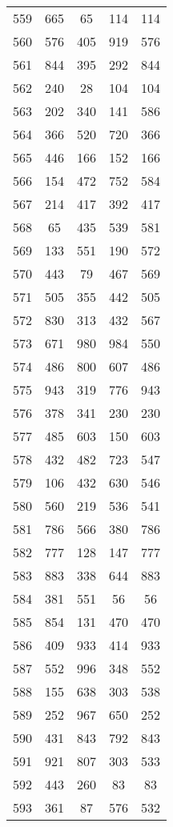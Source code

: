 \documentclass[a4paper,10pt,ngerman]{scrartcl}
\begin{document}
\begin{longtable}[c]{c|c|c|c|c}
    559 & 665 & 65 & 114 & 114 \\
    560 & 576 & 405 & 919 & 576 \\
    561 & 844 & 395 & 292 & 844 \\
    562 & 240 & 28 & 104 & 104 \\
    563 & 202 & 340 & 141 & 586 \\
    564 & 366 & 520 & 720 & 366 \\
    565 & 446 & 166 & 152 & 166 \\
    566 & 154 & 472 & 752 & 584 \\
    567 & 214 & 417 & 392 & 417 \\
    568 & 65 & 435 & 539 & 581 \\
    569 & 133 & 551 & 190 & 572 \\
    570 & 443 & 79 & 467 & 569 \\
    571 & 505 & 355 & 442 & 505 \\
    572 & 830 & 313 & 432 & 567 \\
    573 & 671 & 980 & 984 & 550 \\
    574 & 486 & 800 & 607 & 486 \\
    575 & 943 & 319 & 776 & 943 \\
    576 & 378 & 341 & 230 & 230 \\
    577 & 485 & 603 & 150 & 603 \\
    578 & 432 & 482 & 723 & 547 \\
    579 & 106 & 432 & 630 & 546 \\
    580 & 560 & 219 & 536 & 541 \\
    581 & 786 & 566 & 380 & 786 \\
    582 & 777 & 128 & 147 & 777 \\
    583 & 883 & 338 & 644 & 883 \\
    584 & 381 & 551 & 56 & 56 \\
    585 & 854 & 131 & 470 & 470 \\
    586 & 409 & 933 & 414 & 933 \\
    587 & 552 & 996 & 348 & 552 \\
    588 & 155 & 638 & 303 & 538 \\
    589 & 252 & 967 & 650 & 252 \\
    590 & 431 & 843 & 792 & 843 \\
    591 & 921 & 807 & 303 & 533 \\
    592 & 443 & 260 & 83 & 83 \\
    593 & 361 & 87 & 576 & 532 \\

\end{longtable}
\end{document}
